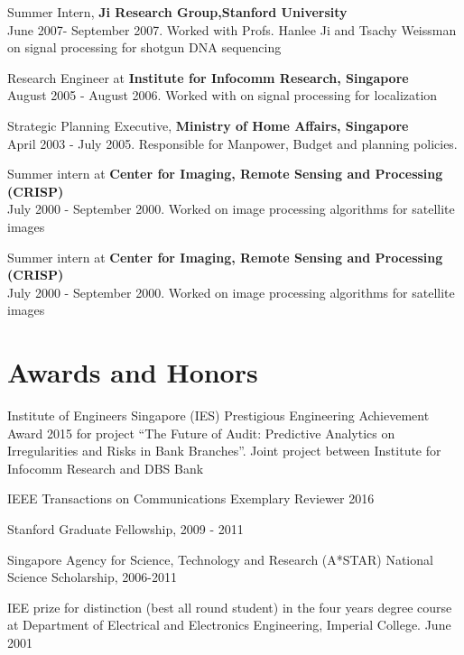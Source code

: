 \documentclass[margin]{res}
\begin{document}
\begin{resume}
Summer Intern, \textbf{Ji Research Group,Stanford University}\\
June 2007- September 2007. Worked with Profs. Hanlee Ji and Tsachy Weissman on signal processing for shotgun DNA sequencing

Research Engineer at \textbf{Institute for Infocomm Research, Singapore} \\
August 2005 - August 2006. Worked with on signal processing for localization

Strategic Planning Executive, \textbf{Ministry of Home Affairs, Singapore} \\
April 2003 - July 2005. Responsible for Manpower, Budget and planning policies.

Summer intern at \textbf{Center for Imaging, Remote Sensing and Processing (CRISP)} \\
July 2000 - September 2000. Worked on image processing algorithms for satellite images


Summer intern at \textbf{Center for Imaging, Remote Sensing and Processing (CRISP)} \\
July 2000 - September 2000. Worked on image processing algorithms for satellite images

\section{Awards and Honors}
Institute of Engineers Singapore (IES) Prestigious Engineering Achievement Award 2015 for project ``The Future of Audit: Predictive Analytics on Irregularities and Risks in Bank Branches''. Joint project between Institute for Infocomm Research and DBS Bank

IEEE Transactions on Communications Exemplary Reviewer 2016

Stanford Graduate Fellowship, 2009 - 2011

Singapore Agency for Science, Technology and Research (A*STAR) National Science Scholarship, 2006-2011

IEE prize for distinction (best all round student) in the four years degree course at Department of Electrical and Electronics Engineering, Imperial College. June 2001 


\end{resume}
\end{document}
